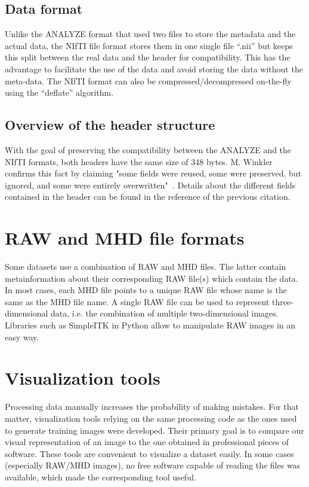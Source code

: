 \subsection{Data format}
\setlength{\marginparwidth}{3cm}\leavevmode {}Unlike the ANALYZE format that used two files to store the metadata and the actual data, the NIfTI file format stores them in one single file “.nii” but keeps this split between the real data and the header for compatibility. This has the advantage to facilitate the use of the data and avoid storing the data without the meta-data. The NIfTI format can also be compressed/decompressed on-the-fly using the “deflate”  algorithm.


\subsection{Overview of the header structure}
\setlength{\marginparwidth}{3cm}\leavevmode {}With the goal of preserving the compatibility between the ANALYZE and the NIfTI formats, both headers have the same size of 348 bytes. M. Winkler confirms this fact by claiming "some fields were reused, some were preserved, but ignored, and some were entirely overwritten"~\cite{52}. Details about the different fields contained in the header can be found in the reference of the previous citation.


\section{RAW and MHD file formats}
\setlength{\marginparwidth}{3cm}\leavevmode {}Some datasets use a combination of RAW and MHD files. The latter contain metainformation about their corresponding RAW file(s) which contain the data. In most cases, each MHD file points to a unique RAW file whose name is the same as the MHD file name. A single RAW file can be used to represent three-dimensional data, i.e. the combination of multiple two-dimensional images. Libraries such as \mbox{SimpleITK} in Python allow to manipulate RAW images in an easy way. 



\section{Visualization tools}
\setlength{\marginparwidth}{3cm}\leavevmode {}
Processing data manually increases the probability of making mistakes. For that matter, visualization tools relying on the same processing code as the ones used to generate training images were developed. Their primary goal is to compare our visual representation of an image to the one obtained in professional pieces of software. These tools are convenient to visualize a dataset easily. In some cases (especially RAW/MHD images), no free software capable of reading the files was available, which made the corresponding tool useful. 


